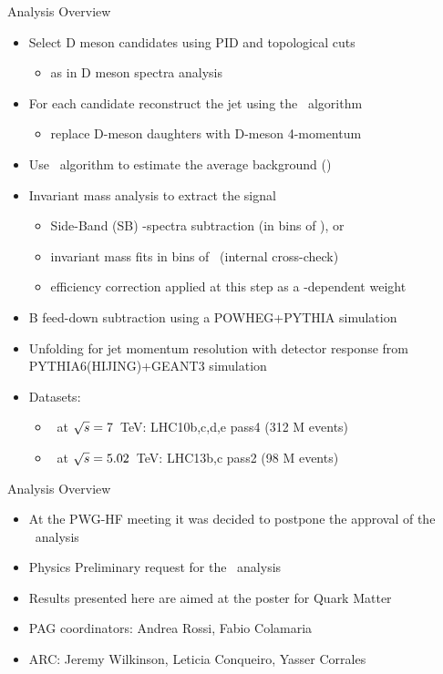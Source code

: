 \documentclass[xcolor={usenames,dvipsnames}]{beamer}
\begin{document}
\begin{frame}{Analysis Overview}
\begin{itemize}
\item \alert{Select D meson candidates using PID and topological cuts}
\begin{itemize}
\item as in D meson spectra analysis
\end{itemize}
\item \alert{For each candidate reconstruct the jet using the \antikt\ algorithm}
\begin{itemize}
\item replace D-meson daughters with D-meson 4-momentum
\end{itemize}
\item Use \kt\ algorithm to estimate the average background (\pPb)
\item Invariant mass analysis to extract the signal
\begin{itemize}
\item \alert{Side-Band (SB) \ptjet-spectra subtraction (in bins of \ptd)}, or
\item invariant mass fits in bins of \ptjet\ (internal cross-check)
\item efficiency correction applied at this step as a \ptd-dependent weight
\end{itemize}
\item \alert{B feed-down subtraction} using a POWHEG+PYTHIA simulation
\item \alert{Unfolding for jet momentum resolution} with detector response from PYTHIA6(HIJING)+GEANT3 simulation
\item Datasets:
\begin{itemize}
\item \pp\ at $\sqrt{s}=7$~TeV: LHC10b,c,d,e pass4 (312 M events)
\item \pPb\ at $\sqrt{s}=5.02$~TeV: LHC13b,c pass2 (98 M events)
\end{itemize}
\end{itemize}
\end{frame}

\begin{frame}{Analysis Overview}
\begin{itemize}
\item At the PWG-HF meeting it was decided to postpone the approval of the \pPb\ analysis
\item Physics Preliminary request for the \pp\ analysis
\item Results presented here are aimed at the poster for Quark Matter
\item PAG coordinators: Andrea Rossi, Fabio Colamaria
\item ARC: Jeremy Wilkinson, Leticia Conqueiro, Yasser Corrales
\end{itemize}
\end{frame}
\end{document}

